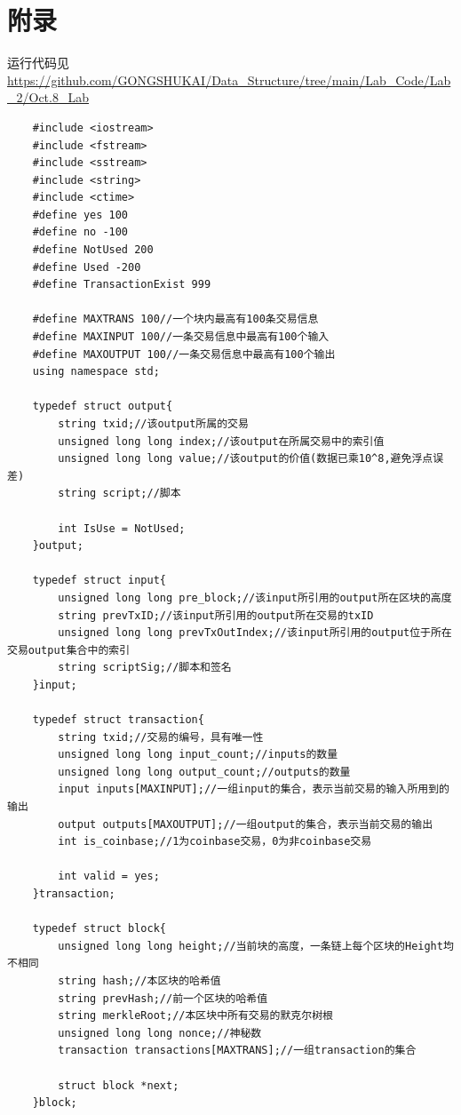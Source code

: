 \documentclass[10pt,a4paper]{article}
\begin{document}
    \section{附录}
    \noindent 运行代码见\url{https://github.com/GONGSHUKAI/Data_Structure/tree/main/Lab_Code/Lab_2/Oct.8_Lab}
    \begin{verbatim}
    #include <iostream>
    #include <fstream>
    #include <sstream>
    #include <string>
    #include <ctime>
    #define yes 100
    #define no -100
    #define NotUsed 200
    #define Used -200
    #define TransactionExist 999
    
    #define MAXTRANS 100//一个块内最高有100条交易信息
    #define MAXINPUT 100//一条交易信息中最高有100个输入
    #define MAXOUTPUT 100//一条交易信息中最高有100个输出
    using namespace std;
    
    typedef struct output{
        string txid;//该output所属的交易
        unsigned long long index;//该output在所属交易中的索引值
        unsigned long long value;//该output的价值(数据已乘10^8,避免浮点误差)
        string script;//脚本
    
        int IsUse = NotUsed;
    }output;
    
    typedef struct input{
        unsigned long long pre_block;//该input所引用的output所在区块的高度
        string prevTxID;//该input所引用的output所在交易的txID
        unsigned long long prevTxOutIndex;//该input所引用的output位于所在交易output集合中的索引
        string scriptSig;//脚本和签名
    }input;
    
    typedef struct transaction{
        string txid;//交易的编号，具有唯一性
        unsigned long long input_count;//inputs的数量
        unsigned long long output_count;//outputs的数量
        input inputs[MAXINPUT];//一组input的集合，表示当前交易的输入所用到的输出
        output outputs[MAXOUTPUT];//一组output的集合，表示当前交易的输出
        int is_coinbase;//1为coinbase交易，0为非coinbase交易
    
        int valid = yes;
    }transaction;
    
    typedef struct block{
        unsigned long long height;//当前块的高度，一条链上每个区块的Height均不相同
        string hash;//本区块的哈希值
        string prevHash;//前一个区块的哈希值
        string merkleRoot;//本区块中所有交易的默克尔树根
        unsigned long long nonce;//神秘数
        transaction transactions[MAXTRANS];//一组transaction的集合
    
        struct block *next;
    }block;
    

\end{verbatim}
\end{document}

